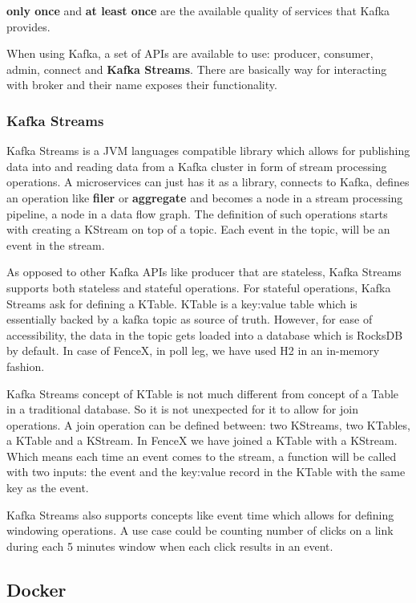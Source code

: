 \documentclass[a4]{report}
\begin{document}
    \textbf{only once} and \textbf{at least once} are the available quality of services that Kafka provides.

    When using Kafka, a set of APIs are available to use: producer, consumer, admin, connect and \textbf{Kafka Streams}.
    There are basically way for interacting with broker and their name exposes their functionality.

    \subsubsection{Kafka Streams}
    Kafka Streams\cite{kafkaStreamsJoins} is a JVM languages compatible library which allows for publishing
    data into and reading data from a Kafka cluster in form of stream processing operations.
    A microservices can just has it as a library, connects to Kafka, defines an operation like \textbf{filer} or
    \textbf{aggregate} and becomes a node in a stream processing pipeline, a node in a data flow graph.
    The definition of such operations starts with creating a KStream on top of a topic.
    Each event in the topic, will be an event in the stream.

    As opposed to other Kafka APIs like producer that are stateless, Kafka Streams supports both stateless and
    stateful operations.
    For stateful operations, Kafka Streams ask for defining a KTable.
    KTable is a key:value table which is essentially backed by a kafka topic as source of truth.
    However, for ease of accessibility, the data in the topic gets loaded into a database which is RocksDB by default.
    In case of FenceX, in poll leg, we have used H2 in an in-memory fashion.

    Kafka Streams concept of KTable is not much different from concept of a Table in a traditional database.
    So it is not unexpected for it to allow for join operations.
    A join operation can be defined between: two KStreams, two KTables, a KTable and a KStream.
    In FenceX we have joined a KTable with a KStream.
    Which means each time an event comes to the stream, a function will be called with two inputs: the event and the
    key:value record in the KTable with the same key as the event.

    Kafka Streams also supports concepts like event time which allows for defining windowing operations.
    A use case could be counting number of clicks on a link during each 5 minutes window when each click results in
    an event.

    \subsection{Docker}
\end{document}
